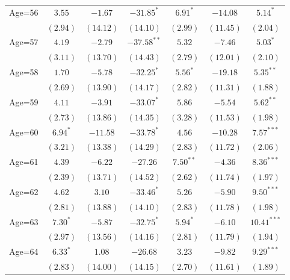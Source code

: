 \documentclass[fullpage]{paper}
\begin{document}
\begin{center}
\begin{longtable}{l c c c c c c }
Age=56      & $3.55$        & $-1.67$       & $-31.85^{*}$  & $6.91^{*}$    & $-14.08$      & $5.14^{*}$    \\
            & $(2.94)$      & $(14.12)$     & $(14.10)$     & $(2.99)$      & $(11.45)$     & $(2.04)$      \\
Age=57      & $4.19$        & $-2.79$       & $-37.58^{**}$ & $5.32$        & $-7.46$       & $5.03^{*}$    \\
            & $(3.11)$      & $(13.70)$     & $(14.43)$     & $(2.79)$      & $(12.01)$     & $(2.10)$      \\
Age=58      & $1.70$        & $-5.78$       & $-32.25^{*}$  & $5.56^{*}$    & $-19.18$      & $5.35^{**}$   \\
            & $(2.69)$      & $(13.90)$     & $(14.17)$     & $(2.82)$      & $(11.31)$     & $(1.88)$      \\
Age=59      & $4.11$        & $-3.91$       & $-33.07^{*}$  & $5.86$        & $-5.54$       & $5.62^{**}$   \\
            & $(2.73)$      & $(13.86)$     & $(14.35)$     & $(3.28)$      & $(11.53)$     & $(1.98)$      \\
Age=60      & $6.94^{*}$    & $-11.58$      & $-33.78^{*}$  & $4.56$        & $-10.28$      & $7.57^{***}$  \\
            & $(3.21)$      & $(13.38)$     & $(14.29)$     & $(2.83)$      & $(11.72)$     & $(2.06)$      \\
Age=61      & $4.39$        & $-6.22$       & $-27.26$      & $7.50^{**}$   & $-4.36$       & $8.36^{***}$  \\
            & $(2.39)$      & $(13.71)$     & $(14.52)$     & $(2.62)$      & $(11.74)$     & $(1.97)$      \\
Age=62      & $4.62$        & $3.10$        & $-33.46^{*}$  & $5.26$        & $-5.90$       & $9.50^{***}$  \\
            & $(2.81)$      & $(13.88)$     & $(14.10)$     & $(2.83)$      & $(11.78)$     & $(1.98)$      \\
Age=63      & $7.30^{*}$    & $-5.87$       & $-32.75^{*}$  & $5.94^{*}$    & $-6.10$       & $10.41^{***}$ \\
            & $(2.97)$      & $(13.56)$     & $(14.16)$     & $(2.81)$      & $(11.79)$     & $(1.94)$      \\
Age=64      & $6.33^{*}$    & $1.08$        & $-26.68$      & $3.23$        & $-9.82$       & $9.29^{***}$  \\
            & $(2.83)$      & $(14.00)$     & $(14.15)$     & $(2.70)$      & $(11.61)$     & $(1.89)$      \\

\end{longtable}
\end{center}
\end{document}
